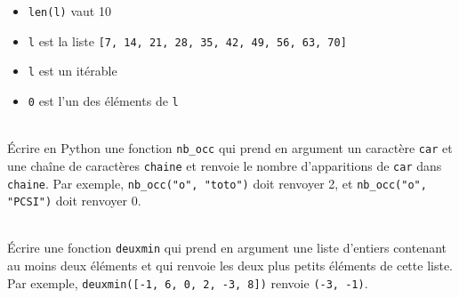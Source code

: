 \documentclass[11pt,a4paper]{article}
\begin{document}
\begin{Exercise}[title={QCM}]
\begin{tabularx}{\linewidth}{@{}XXXX@{}}
	\end{tabularx}
    \begin{itemize}
    \item[\gc] {\tt len(l)} vaut 10 
    \item[\bc] {\tt l} est la liste {\tt [7, 14, 21, 28, 35, 42, 49, 56, 63, 70]} 
    \item[\gc] {\tt l} est un itérable
    \item[\gc] {\tt 0} est l'un des éléments de {\tt l} 
    \end{itemize}
\end{Exercise}

\begin{Exercise}[title = {Définir une fonction}]\\
    Écrire en Python une fonction {\tt nb\_occ} qui prend en argument un caractère {\tt car} et une chaîne de caractères {\tt chaine} et renvoie le nombre d'apparitions de {\tt car} dans {\tt chaine}. Par exemple, {\tt nb\_occ("o", "toto")} doit renvoyer 2, et {\tt nb\_occ("o", "PCSI")} doit renvoyer 0.
	\ifcorrige
	\fi
\end{Exercise}


\begin{Exercise}[title = {Exercice bonus}]\\
	Écrire une fonction {\tt deuxmin} qui prend en argument une liste d'entiers contenant au moins deux éléments et qui renvoie les deux plus petits éléments de cette liste. Par exemple, {\tt deuxmin([-1, 6, 0, 2, -3, 8])} renvoie {\tt (-3, -1)}.
\end{Exercise}
	\ifcorrige
	\fi
\end{document}
